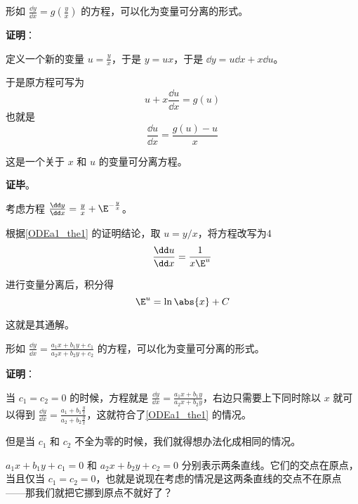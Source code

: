 \begin{theorem}{}\label{ODEa1_the1}
形如 $\frac{\dd y}{\dd x}=g(\frac{y}{x})$ 的方程，可以化为变量可分离的形式。
\end{theorem}

\textbf{证明}：

定义一个新的变量 $u=\frac{y}{x}$，于是 $y=ux$，于是 $\dd y=u\dd x+x\dd u$。

于是原方程可写为
\begin{equation}
u+x\frac{\dd u}{\dd x}=g(u)
\end{equation}
也就是
\begin{equation}
\frac{\dd u}{\dd x}=\frac{g(u)-u}{x}
\end{equation}

这是一个关于 $x$ 和 $u$ 的变量可分离方程。

\textbf{证毕}。

\begin{example}{}
考虑方程 $\frac{\dd y}{\dd x}=\frac{y}{x}+\E^{-\frac{y}{x}}$。

根据\autoref{ODEa1_the1} 的证明结论，取 $u=y/x$，将方程改写为4
\begin{equation}
\frac{\dd u}{\dd x}=\frac{1}{x\E^u}
\end{equation}

进行变量分离后，积分得
\begin{equation}
\E^u=\ln\abs{x}+C
\end{equation}

这就是其通解。


\end{example}


\begin{corollary}{}\label{ODEa1_cor1}
形如 $\frac{\dd y}{\dd x}=\frac{a_1x+b_1y+c_1}{a_2x+b_2y+c_2}$ 的方程，可以化为变量可分离的形式。
\end{corollary}

\textbf{证明}：

当 $c_1=c_2=0$ 的时候，方程就是 $\frac{\dd y}{\dd x}=\frac{a_1x+b_1y}{a_2x+b_2y}$，右边只需要上下同时除以 $x$ 就可以得到 $\frac{\dd y}{\dd x}=\frac{a_1+b_1\frac{y}{x}}{a_2+b_2\frac{y}{x}}$，这就符合了\autoref{ODEa1_the1} 的情况。

但是当 $c_1$ 和 $c_2$ 不全为零的时候，我们就得想办法化成相同的情况。

$a_1x+b_1y+c_1=0$ 和 $a_2x+b_2y+c_2=0$ 分别表示两条直线。它们的交点在原点，当且仅当 $c_1=c_2=0$，也就是说现在考虑的情况是这两条直线的交点不在原点——那我们就把它挪到原点不就好了？

